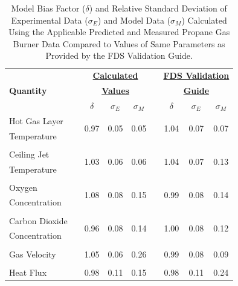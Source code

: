\begin{table}[!ht]
\caption[Calculated $\delta$, $\sigma_E$, and $\sigma_M$ Values Compared to Values Stated in FDS Validation Guide.]{Model Bias Factor ($\delta$) and Relative Standard Deviation of Experimental Data ($\sigma_E$) and Model Data ($\sigma_M$) Calculated Using the Applicable Predicted and Measured Propane Gas Burner Data Compared to Values of Same Parameters as Provided by the FDS Validation Guide.}
\begin{center}
\begin{tabular}{lcccccccc}
\toprule
					& & \multicolumn{3}{c}{\textbf{\underline{Calculated}}} & & \multicolumn{3}{c}{\textbf{\underline{FDS Validation}}}   \\
\textbf{Quantity} 	& & \multicolumn{3}{c}{\textbf{\underline{Values}}} 	& & \multicolumn{3}{c}{\textbf{\underline{Guide}}} \\
				 	& & $\delta$ 	&  $\sigma_E$ 	& 	$\sigma_M$ 			& & $\delta$ 	&  $\sigma_E$ 	& 	$\sigma_M$ 		\\	
\midrule
Hot Gas Layer 		& & \multirow{2}{*}{0.97} & \multirow{2}{*}{0.05} & \multirow{2}{*}{0.05} & & \multirow{2}{*}{1.04} & \multirow{2}{*}{0.07} & \multirow{2}{*}{0.07} 	\\
Temperature 		& &					   	  & 					  & 					  & &						& 					   &						\\
\multicolumn{9}{c}{} \\
Ceiling Jet 		& & \multirow{2}{*}{1.03} & \multirow{2}{*}{0.06} & \multirow{2}{*}{0.06} & & \multirow{2}{*}{1.04} & \multirow{2}{*}{0.07} & \multirow{2}{*}{0.13} 	\\
Temperature 		& & 					  & 					  & 					  & &						& 					   &						\\
\multicolumn{9}{c}{} \\
Oxygen 				& & \multirow{2}{*}{1.08}  & \multirow{2}{*}{0.08} & \multirow{2}{*}{0.15} & & \multirow{2}{*}{0.99} & \multirow{2}{*}{0.08} & \multirow{2}{*}{0.14} 	\\
Concentration 		& & 					   & 					  & 					   & & 						& 					   &						\\
\multicolumn{9}{c}{} \\
Carbon Dioxide 		& & \multirow{2}{*}{0.96}  & \multirow{2}{*}{0.08} & \multirow{2}{*}{0.14} & & \multirow{2}{*}{1.00} & \multirow{2}{*}{0.08} & \multirow{2}{*}{0.12} 	\\
Concentration 		& & 					   & 					  & 					   & & 						& 					   &						\\
\multicolumn{9}{c}{} \\
Gas Velocity 		& & 1.05  & 0.06 & 0.26 & & 0.99 & 0.08 & 0.09 	\\
\multicolumn{9}{c}{} \\
Heat Flux 			& & 0.98  & 0.11 & 0.15 & & 0.98 & 0.11 & 0.24 	\\
\bottomrule
\end{tabular}
\end{center}
\label{table:stats_compare}
\end{table}
\FloatBarrier

